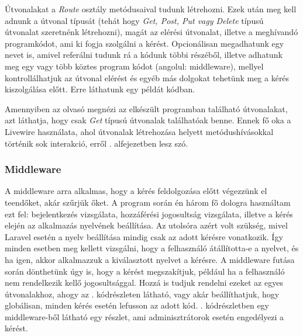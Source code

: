 \documentclass[
]{thesis-ekf}
\theoremstyle{definition}
\theoremstyle{remark}
\begin{document}
Útvonalakat a \emph{Route} osztály metódusaival tudunk létrehozni. Ezek után meg kell adnunk a útvonal típusát (tehát hogy \emph{Get, Post, Put vagy Delete} típusú útvonalat szeretnénk létrehozni), magát az elérési útvonalat, illetve a meghívandó programkódot, ami ki fogja szolgálni a kérést. Opcionálisan megadhatunk egy nevet is, amivel referálni tudunk rá a kódunk többi részéből, illetve adhatunk meg egy vagy több köztes program kódot (angolul: middleware), mellyel kontrollálhatjuk az útvonal elérést és egyéb más dolgokat tehetünk meg a kérés kiszolgálása előtt.\cite{routing} Erre láthatunk egy példát  kódban.

Amennyiben az olvasó megnézi az elkészült programban található útvonalakat, azt láthatja, hogy csak \emph{Get} típusú útvonalak találhatóak benne. Ennek fő oka a Livewire\cite{livewire} használata, ahol útvonalak létrehozása helyett metódushívásokkal történik sok interakció, erről . alfejezetben lesz szó.

\subsubsection{Middleware}

A middleware arra alkalmas, hogy a kérés feldolgozása előtt végezzünk el teendőket, akár szűrjük őket.\cite{middleware} A program során én három fő dologra használtam ezt fel: bejelentkezés vizsgálata, hozzáférési jogosultság vizsgálata, illetve a kérés elején az alkalmazás nyelvének beállítása. Az utolsóra azért volt szükség, mivel Laravel esetén a nyelv beállítása mindig csak az adott kérésre vonatkozik. Így minden esetben meg kellett vizsgálni, hogy a felhasználó átállította-e a nyelvet, és ha igen, akkor alkalmazzuk a kiválasztott nyelvet a kérésre. A middleware futása során dönthetünk úgy is, hogy a kérést megszakítjuk, például ha a felhasználó nem rendelkezik kellő jogosultsággal. Hozzá is tudjuk rendelni ezeket az egyes útvonalakhoz, ahogy az . kódrészleten látható, vagy akár beállíthatjuk, hogy globálisan, minden kérés esetén lefusson az adott kód. . kódrészletben egy middleware-ből látható egy részlet, ami adminisztrátorok esetén engedélyezi a kérést.


\end{document}
